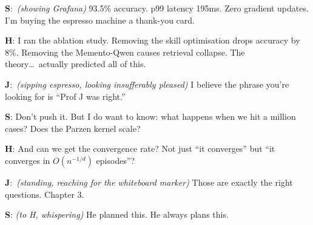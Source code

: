 \documentclass[11pt,a4paper]{article}
\newcommand{\J}[0]{{\sffamily\bfseries\color{marginJ}J}}
\newcommand{\Hstudent}[0]{{\sffamily\bfseries\color{marginH}H}}
\newcommand{\Senior}[0]{{\sffamily\bfseries\color{marginS}S}}
\newcommand{\stage}[1]{{\small\itshape\color{black!50}(#1)}}
\begin{document}
\begin{epilogue}

\Senior:~\stage{showing Grafana} 93.5\% accuracy. p99 latency 195ms. Zero gradient updates. I'm buying the espresso machine a thank-you card.

\vspace{4pt}
\Hstudent: I ran the ablation study. Removing the skill optimisation drops accuracy by 8\%. Removing the Memento-Qwen causes retrieval collapse. The theory\ldots\ actually predicted all of this.

\vspace{4pt}
\J:~\stage{sipping espresso, looking insufferably pleased} I believe the phrase you're looking for is ``Prof J was right.''

\vspace{4pt}
\Senior: Don't push it. But I do want to know: what happens when we hit a million cases? Does the Parzen kernel scale?

\vspace{4pt}
\Hstudent: And can we get the convergence rate? Not just ``it converges'' but ``it converges in $O(n^{-1/d})$ episodes''?

\vspace{4pt}
\J:~\stage{standing, reaching for the whiteboard marker} Those are exactly the right questions. Chapter 3.

\vspace{4pt}
\Senior: \stage{to H, whispering} He planned this. He always plans this.

\end{epilogue}





\end{document}
